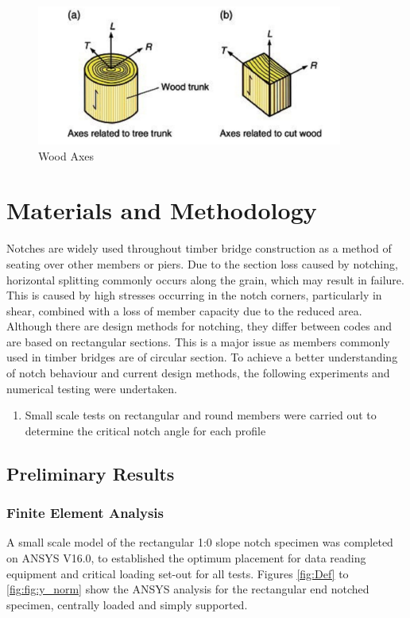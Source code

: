 \documentclass[11pt,a4paper]{article}
\numberwithin{equation}{subsection}
\begin{document}
\begin{figure}[h]
	\begin{center}
		\includegraphics[scale=0.9]{Wood_Axes}
	\end{center}
 	\caption{Wood Axes \cite{porteous_structural_2013}}
 	\label{fig:Axes}
\end{figure}

\vspace*{\baselineskip}
\pagebreak

\section{Materials and Methodology}
Notches are widely used throughout timber bridge construction as a method of seating over other members or piers. Due to the section loss caused by notching, horizontal splitting commonly occurs along the grain, which may result in failure. This is caused by high stresses occurring in the notch corners, particularly in shear, combined with a loss of member capacity due to the reduced area. Although there are design methods for notching, they differ between codes and are based on rectangular sections. This is a major issue as members commonly used in timber bridges are of circular section. To achieve a better understanding of notch behaviour and current design methods, the following experiments and numerical testing were undertaken. 

	\begin{enumerate}
		\item Small scale tests on rectangular and round members were carried out to determine the critical notch angle for each profile
	\end{enumerate}

\subsection{Preliminary Results}

\subsubsection{Finite Element Analysis}
A small scale model of the rectangular 1:0 slope notch specimen was completed on ANSYS V16.0, to established the optimum placement for data reading equipment and critical loading set-out for all tests. Figures \ref{fig:Def} to \ref{fig:fig:y_norm} show the ANSYS analysis for the rectangular end notched specimen, centrally loaded and simply supported.
\end{document}
